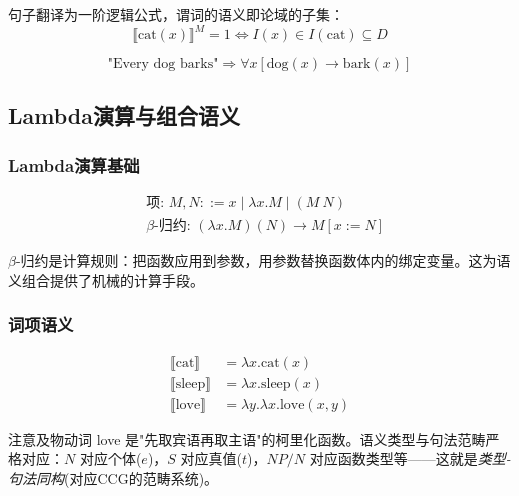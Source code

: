 句子翻译为一阶逻辑公式，谓词的语义即论域的子集：
\begin{equation}
    \llbracket \text{cat}(x) \rrbracket^M = 1 \iff I(x) \in I(\text{cat}) \subseteq D
\end{equation}

\begin{example}
\begin{equation}
    \text{"Every dog barks"} \Longrightarrow \forall x[\text{dog}(x) \rightarrow \text{bark}(x)]
\end{equation}
\end{example}

\subsection{Lambda演算与组合语义}

\subsubsection{Lambda演算基础}

\begin{equation}
    \begin{aligned}
    &\text{项: } M, N ::= x \mid \lambda x.M \mid (M \ N) \\
    &\beta\text{-归约: } (\lambda x.M)(N) \rightarrow M[x := N]
    \end{aligned}
\end{equation}

$\beta$-归约是计算规则：把函数应用到参数，用参数替换函数体内的绑定变量。这为语义组合提供了机械的计算手段。

\subsubsection{词项语义}

\begin{equation}
    \begin{aligned}
    \llbracket \text{cat} \rrbracket &= \lambda x.\text{cat}(x) \\
    \llbracket \text{sleep} \rrbracket &= \lambda x.\text{sleep}(x) \\
    \llbracket \text{love} \rrbracket &= \lambda y.\lambda x.\text{love}(x,y)
    \end{aligned}
\end{equation}

注意及物动词 love 是"先取宾语再取主语"的柯里化函数。语义类型与句法范畴严格对应：$N$ 对应个体($e$)，$S$ 对应真值($t$)，$NP/N$ 对应函数类型等——这就是\emph{类型-句法同构}(对应CCG的范畴系统)。

